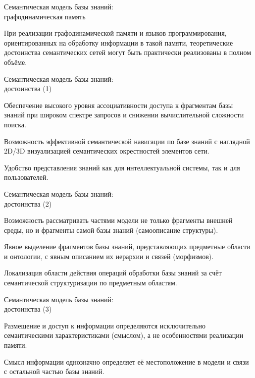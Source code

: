 \begin{frame}{Семантическая модель базы знаний:\\графодинамическая память}
	\topline
	\justifying
	
	При реализации графодинамической памяти и языков программирования, ориентированных на обработку информации в такой памяти, теоретические достоинства семантических сетей могут быть практически реализованы в полном объёме.
	
\end{frame}


\begin{frame}{Семантическая модель базы знаний:\\достоинства (1)}
	\topline
	\justifying
	
	\begin{textitemize}
		\item Обеспечение высокого уровня ассоциативности доступа к фрагментам базы знаний при широком спектре запросов и снижении вычислительной сложности поиска.
		\item Возможность эффективной семантической навигации по базе знаний с наглядной 2D/3D визуализацией семантических окрестностей элементов сети.
		\item Удобство представления знаний как для интеллектуальной системы, так и для пользователей.
	\end{textitemize}
	
\end{frame}


\begin{frame}{Семантическая модель базы знаний:\\достоинства (2)}
	\topline
	\justifying
	
	\begin{textitemize}
		\item Возможность рассматривать частями модели не только фрагменты внешней среды, но и фрагменты самой базы знаний (самоописание структуры).
		\item Явное выделение фрагментов базы знаний, представляющих предметные области и онтологии, с явным описанием их иерархии и связей (морфизмов).
		\item Локализация области действия операций обработки базы знаний за счёт семантической структуризации по предметным областям.
	\end{textitemize}
	
\end{frame}


\begin{frame}{Семантическая модель базы знаний:\\достоинства (3)}
	\topline
	\justifying
	
	\begin{textitemize}
		\item Размещение и доступ к информации определяются исключительно семантическими характеристиками (смыслом), а не особенностями реализации памяти.
		\item Смысл информации однозначно определяет её местоположение в модели и связи с остальной частью базы знаний.
	\end{textitemize}
	
\end{frame}


